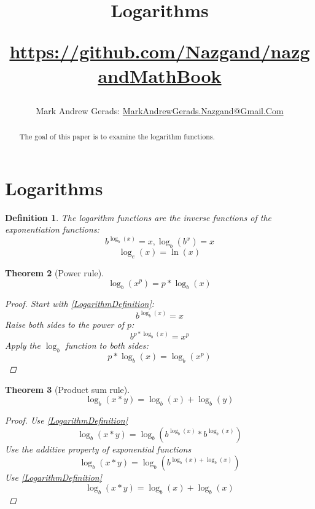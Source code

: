 \documentclass[]{article}
\author{Mark Andrew Gerads: \href{MailTo:MarkAndrewGerads.Nazgand@Gmail.Com}{MarkAndrewGerads.Nazgand@Gmail.Com}}
\title{
	Logarithms
	
	\href{https://github.com/Nazgand/nazgandMathBook}{https://github.com/Nazgand/nazgandMathBook}
}
\newcommand{\pqty}[1]{{\left(#1\right)}}
\newtheorem{theorem}{Theorem}[section]
\newtheorem{definition}[theorem]{Definition}
\numberwithin{equation}{section}
\begin{document}
	
	\maketitle
	
	\begin{abstract}
		The goal of this paper is to examine the logarithm functions.
	\end{abstract}
	
	\section{Logarithms}
	\begin{definition}
		The logarithm functions are the inverse functions of the exponentiation functions:
		\begin{equation}
			\label{LogarithmDefinition}
			b^{\log_b\pqty{x}}=x
			,
			\log_b\pqty{b^x}=x
		\end{equation}
		\begin{equation}
		\log_e\pqty{x}=\ln\pqty{x}
		\end{equation}
	\end{definition}

	\begin{theorem}[Power rule]
		\begin{equation}
		\log_b\pqty{x^p}=p*\log_b\pqty{x}
		\end{equation}
		\begin{proof}
			Start with \eqref{LogarithmDefinition}:
			\begin{equation}
			b^{\log_b\pqty{x}}=x
			\end{equation}
			Raise both sides to the power of \(p\):
			\begin{equation}
			b^{p*\log_b\pqty{x}}=x^p
			\end{equation}
			Apply the \(\log_b\) function to both sides:
			\begin{equation}
			p*\log_b\pqty{x}=\log_b\pqty{x^p}
			\end{equation}
		\end{proof}
	\end{theorem}

	\begin{theorem}[Product sum rule]
		\begin{equation}
		\log_b\pqty{x*y}=\log_b\pqty{x}+\log_b\pqty{y}
		\end{equation}
		\begin{proof}
			Use \eqref{LogarithmDefinition}
			\begin{equation}
			\log_b\pqty{x*y}=
			\log_b\pqty{b^{\log_b\pqty{x}}*b^{\log_b\pqty{x}}}
			\end{equation}
			Use the additive property of exponential functions
			\begin{equation}
			\log_b\pqty{x*y}=
			\log_b\pqty{b^{\log_b\pqty{x}+\log_b\pqty{x}}}
			\end{equation}
			Use \eqref{LogarithmDefinition}
			\begin{equation}
			\log_b\pqty{x*y}=
			\log_b\pqty{x}+\log_b\pqty{x}
			\end{equation}
		\end{proof}
	\end{theorem}
\end{document}
